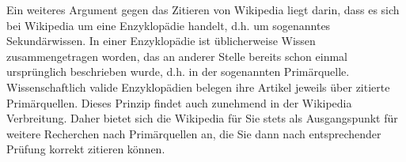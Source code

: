 \smallskip

Ein weiteres Argument gegen das Zitieren von Wikipedia liegt darin, dass es sich bei Wikipedia um eine Enzyklopädie handelt, d.h. um sogenanntes \glqq Sekundärwissen\grqq .
In einer Enzyklopädie ist üblicherweise Wissen zusammengetragen worden, das an anderer Stelle bereits schon einmal ursprünglich beschrieben wurde, d.h. in der sogenannten Primärquelle.
Wissenschaftlich valide Enzyklopädien belegen ihre Artikel jeweils über zitierte Primärquellen.
Dieses Prinzip findet auch zunehmend in der Wikipedia Verbreitung.
Daher bietet sich die Wikipedia für Sie stets als Ausgangspunkt für weitere Recherchen nach Primärquellen an, die Sie dann nach entsprechender Prüfung korrekt zitieren können.


